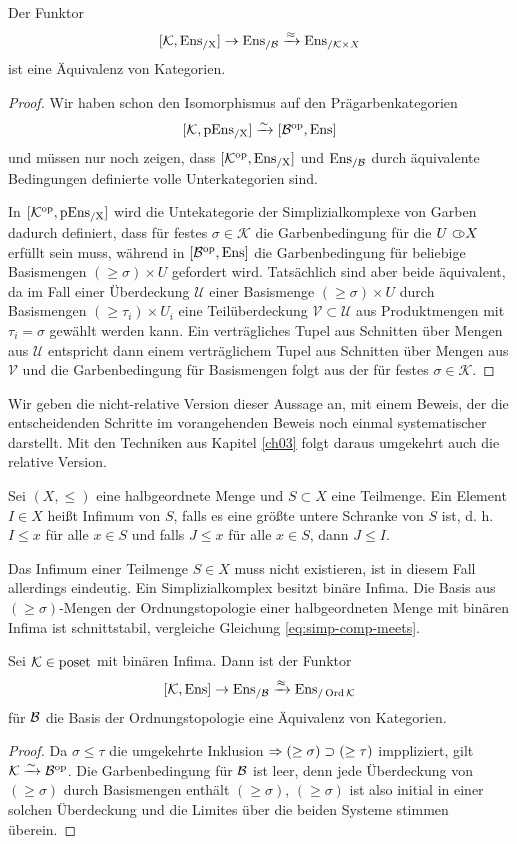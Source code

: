\begin{satz} \label{sheaf-simp-compl}
  Der Funktor
  \[
  [\mathcal{K}, \operatorname{Ens_{/X}}] \to \operatorname{Ens_{/\mathcal{B}}} \xrightarrow{\approx} \operatorname{Ens}_{/\mathcal{K} \times X}
  \]
  ist eine Äquivalenz von Kategorien.
\end{satz}
\begin{proof}
  Wir haben schon den Isomorphismus auf den Prägarbenkategorien
  \[ [\mathcal{K}, \operatorname{pEns_{/X}}] \xrightarrow[]{\sim} {[\mathcal{B}^\mathrm{op}, \operatorname{Ens}]} \]
  und müssen nur noch zeigen, dass $[\mathcal{K}^\mathrm{op}, \operatorname{Ens_{/X}}]$ und
  $\operatorname{Ens_{/\mathcal{B}}}$ durch äquivalente Bedingungen definierte volle
  Unterkategorien sind.

  In $[\mathcal{K}^\mathrm{op}, \operatorname{pEns_{/X}}]$ wird die Untekategorie der
  Simplizialkomplexe von Garben dadurch definiert, dass für festes
  $\sigma \in \mathcal{K}$ die Garbenbedingung für die $U \subset\kern-0.58em\circ X$
  erfüllt sein muss, während in $[\mathcal{B}^\mathrm{op}, \operatorname{Ens}]$ die Garbenbedingung
  für beliebige Basismengen $(\geq \sigma) \times U$ gefordert
  wird. Tatsächlich sind aber beide äquivalent, da im Fall einer
  Überdeckung $\mathcal{U}$ einer Basismenge $(\geq \sigma) \times U$
  durch Basismengen $(\geq \tau_i) \times U_i$ eine Teilüberdeckung
  $\mathcal{V} \subset \mathcal{U}$ aus Produktmengen mit $\tau_i =
  \sigma$ gewählt werden kann. Ein verträgliches Tupel aus Schnitten
  über Mengen aus $\mathcal{U}$ entspricht dann einem verträglichem
  Tupel aus Schnitten über Mengen aus $\mathcal{V}$ und die
  Garbenbedingung für Basismengen folgt aus der für festes
  $\sigma \in \mathcal{K}$.
\end{proof}
Wir geben die nicht-relative Version dieser Aussage an, mit einem
Beweis, der die entscheidenden Schritte im vorangehenden Beweis noch
einmal systematischer darstellt. Mit den Techniken aus Kapitel
\ref{ch03} folgt daraus umgekehrt auch die relative Version.
\begin{defn}
  Sei $(X, \leq)$ eine halbgeordnete Menge und $S \subset X$ eine
  Teilmenge. Ein Element $I \in X$ heißt Infimum von $S$, falls es
  eine größte untere Schranke von $S$ ist, d. h. $I \leq x$ für alle
  $x \in S$ und falls $J \leq x$ für alle $x \in S$, dann $J \leq I$.
\end{defn}
Das Infimum einer Teilmenge $S \in X$ muss nicht existieren, ist in
diesem Fall allerdings eindeutig. Ein Simplizialkomplex besitzt binäre
Infima. Die Basis aus $(\geq \sigma)$-Mengen der Ordnungstopologie
einer halbgeordneten Menge mit binären Infima ist schnittstabil,
vergleiche Gleichung \ref{eq:simp-comp-meets}.
\begin{satz} \label{sheaf-order-top}
  Sei $\mathcal{K} \in \operatorname{poset}$ mit binären Infima. Dann ist der Funktor
  \[
  [\mathcal{K}, \operatorname{Ens}] \to \operatorname{Ens_{/\mathcal{B}}} \xrightarrow{\approx} \operatorname{Ens}_{/\operatorname{Ord} \mathcal{K}}
  \]
  für $\mathcal{B}$ die Basis der Ordnungstopologie eine Äquivalenz von
  Kategorien.
\end{satz}
\begin{proof}
   Da $\sigma \leq \tau$ die umgekehrte Inklusion $\Rightarrow (\geq
   \sigma) \supset (\geq \tau)$ imppliziert, gilt $\mathcal{K} \xrightarrow[]{\sim} \mathcal{B}^\mathrm{op}$. Die
   Garbenbedingung für $\mathcal{B}$ ist leer, denn jede Überdeckung von $(\geq
   \sigma)$ durch Basismengen enthält $(\geq \sigma)$, $(\geq \sigma)$
   ist also initial in einer solchen Überdeckung und die Limites über
   die beiden Systeme stimmen überein.
\end{proof}

